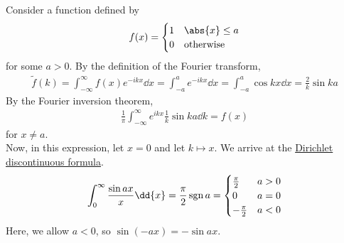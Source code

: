 \begin{example}
	Consider a function defined by
	\begin{align*}
		f(x) = \begin{cases}
			1 & \abs{x} \leq a   \\
			0 & \text{otherwise}
		\end{cases}
	\end{align*}
	for some $a > 0$.
	By the definition of the Fourier transform,
	\begin{align} \label{eq:8.15}
		\widetilde f(k) = \int_{-\infty}^\infty f(x) e^{-ikx} \dd{x} = \int_{-a}^a e^{-ikx} \dd{x} = \int_{-a}^a \cos kx \dd{x} = \frac{2}{k} \sin ka
	\end{align}
	By the Fourier inversion theorem,
	\begin{align*}
		\frac{1}{\pi} \int_{-\infty}^\infty e^{ikx} \frac{1}{k} \sin ka \dd{k} = f(x)
	\end{align*}
	for $x \neq a$. \\
	Now, in this expression, let $x = 0$ and let $k \mapsto x$.
	We arrive at the \underline{Dirichlet discontinuous formula}.
	\begin{align} \label{eq:8,16}
		\int_0^\infty \frac{\sin ax}{x} \dd{x} = \frac{\pi}{2} \sgn a = \begin{cases}
			\frac{\pi}{2}  & a > 0 \\
			0              & a = 0 \\
			-\frac{\pi}{2} & a < 0
		\end{cases}
	\end{align}
	Here, we allow $a < 0$, so $\sin(-ax) = -\sin ax$.
\end{example}

